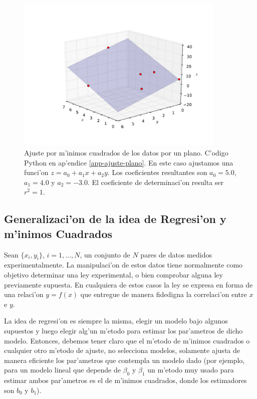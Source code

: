 \documentclass[a4paper]{report}
\begin{document}
\begin{figure}[h!]
\begin{center}
\includegraphics[width=10cm]{figs/fig-ajuste-plano.pdf}
\caption{Ajuste por m'inimos cuadrados de los datos por un plano. C'odigo Python en ap'endice \ref{app-ajuste-plano}. En este caso ajustamos una funci'on $z=a_0+a_1x+a_2y$. Los coeficientes resultantes son $a_0=5.0$, $a_1=4.0$ y $a_2=-3.0$. El coeficiente de determinaci'on resulta ser $r^2=1$.}
\end{center}
\label{fig-ajuste-plano}
\end{figure}


\subsection{Generalizaci'on de la idea de Regresi'on y m'inimos Cuadrados}
Sean $\{x_i,y_i\}$, $i=1,\dots,N$, un conjunto de $N$ pares de datos medidos experimentalmente. La manipulaci'on de estos datos tiene normalmente como objetivo determinar una ley experimental, o bien comprobar alguna ley previamente supuesta. En cualquiera de estos casos la ley se expresa en forma de una relaci'on $y=f(x)$ que entregue de manera fidedigna la correlaci'on entre $x$ e $y$.

La idea de regresi'on es siempre la misma, elegir un modelo bajo algunos supuestos y luego elegir alg'un m'etodo para estimar los par'ametros de dicho modelo. Entonces, debemos tener claro que el m'etodo de m'inimos cuadrados o cualquier otro m'etodo de ajuste, no selecciona modelos, solamente ajusta de manera eficiente los par'ametros que contempla un modelo dado (por ejemplo, para un modelo lineal que depende de $\beta_{0}$ y $\beta_{1}$ un m'etodo muy usado para estimar ambos par'ametros es el de m'inimos cuadrados, donde los estimadores son $b_{0}$ y $b_{1}$).
\end{document}

